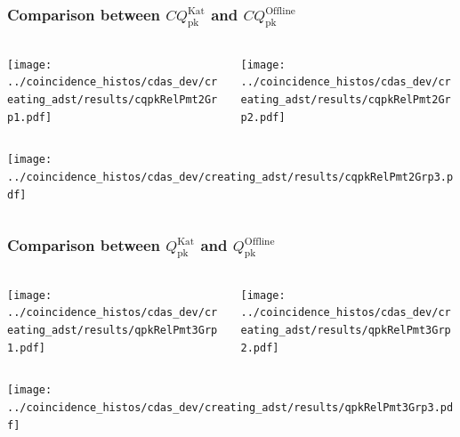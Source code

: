 \documentclass[aspectratio=169]{beamer}
\begin{document}
\begin{frame}
  \frametitle{Comparison between
  $CQ^{\mathrm{Kat}}_{\mathrm{pk}}$ and $CQ^{\mathrm{Offline}}_{\mathrm{pk}}$}
  \vspace{0.1cm}
  \begin{columns}
    \centering
    \begin{column}{0.5\textwidth}
      \texttt{[image: ../coincidence\_histos/cdas\_dev/creating\_adst/results/cqpkRelPmt2Grp1.pdf]}
    \end{column}
    \begin{column}{0.5\textwidth}
      \texttt{[image: ../coincidence\_histos/cdas\_dev/creating\_adst/results/cqpkRelPmt2Grp2.pdf]}
    \end{column}
  \end{columns}

  \begin{columns}
    \centering
    \begin{column}{0.5\textwidth}
      \texttt{[image: ../coincidence\_histos/cdas\_dev/creating\_adst/results/cqpkRelPmt2Grp3.pdf]}
    \end{column}
  \end{columns}
\end{frame}

\begin{frame}
  \frametitle{Comparison between $Q^{\mathrm{Kat}}_{\mathrm{pk}}$
  and $Q^{\mathrm{Offline}}_{\mathrm{pk}}$}
  \vspace{0.1cm}
  \begin{columns}
    \centering
    \begin{column}{0.5\textwidth}
      \texttt{[image: ../coincidence\_histos/cdas\_dev/creating\_adst/results/qpkRelPmt3Grp1.pdf]}
    \end{column}
    \begin{column}{0.5\textwidth}
      \texttt{[image: ../coincidence\_histos/cdas\_dev/creating\_adst/results/qpkRelPmt3Grp2.pdf]}
    \end{column}
  \end{columns}

  \begin{columns}
    \centering
    \begin{column}{0.5\textwidth}
      \texttt{[image: ../coincidence\_histos/cdas\_dev/creating\_adst/results/qpkRelPmt3Grp3.pdf]}
    \end{column}
  \end{columns}
\end{frame}
\end{document}
